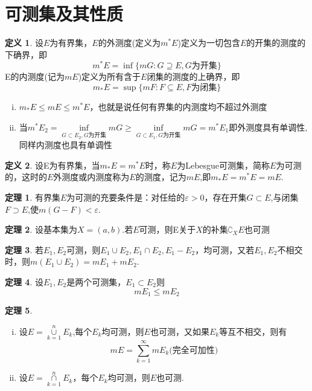 \documentclass[oneside]{ctexbook}
\theoremstyle{definition} \newtheorem{defi}{定义}[section]
\theoremstyle{definition} \newtheorem{law}{定理}[section]
\theoremstyle{definition} \newtheorem{jury}{引理}[section]
\theoremstyle{remark} \newtheorem*{mar}{\heiti 推论}
\begin{document}
\section{可测集及其性质}
\begin{defi}
	设$E$为有界集，$E$的外测度(定义为$m^{*}E$)定义为一切包含$E$的开集的测度的下确界，即\[m^{*}E=\inf\{mG:G\supseteq E,G\text{为开集}\}\]
	E的内测度(记为$mE$)定义为所有含于$E$闭集的测度的上确界，即\[m_{*}E=\sup\{mF:F\subseteq E,F\text{为闭集}\}\]
\end{defi}
\begin{enumerate}[(i)]
	\item $m_{*}E\leq mE\leq m^{*}E$，也就是说任何有界集的内测度均不超过外测度
	\item 当$m^{*}E_{2}=\underset{G\subset E_{2},G\text{为开集}}{\inf}mG\geq \underset{G\subset E_{1},G\text{为开集}}{\inf}mG=m^{*}E_{1}$即外测度具有单调性,同样内测度也具有单调性
\end{enumerate}
\begin{defi}
	设E为有界集，当$m_{*}E=m^{*}E$时，称$E$为Lebesgue可测集，简称$E$为可测的，这时的$E$外测度或内测度称为$E$的测度，记为$mE$,即$m_{*}E=m^{*}E= mE.$
\end{defi}
\begin{law}
	有界集$E$为可测的充要条件是：对任给的$\varepsilon> 0$，存在开集$G\subset E$,与闭集$F\supset E$,使$m(G-F)< \varepsilon $.
\end{law}
\begin{law}
	设基本集为$X=(a,b)$.若$E$可测，则E关于$X$的补集$\complement_{X}E$也可测
\end{law}
\begin{law}
	若$E_{1},E_{2}$可测，则$E_{1}\cup E_{2},E_{1}\cap E_{2},E_{1}-E_{2}$，均可测，又若$E_{1},E_{2}$不相交时，则$m(E_{1}\cup E_{2})=mE_{1}+mE_{2}$.
\end{law}
\begin{law}
	设$E_{1},E_{2}$是两个可测集，$E_{1}\subset E_{2}$则\[mE_{1}\leq mE_{2}\]
\end{law}
\begin{law}
	\begin{enumerate}[(i)]
		\item 设$E=\overset{n}{\underset{k=1}\cup }E_{k}$,每个$E_{k}$均可测，则$E$也可测，又如果$E_{k}$等互不相交，则有\[mE=\sum_{k=1}^{\infty}mE_{k}\text{(完全可加性)}\]
		\item 设$E=\overset{n}{\underset{k=1}\cap }E_{k}$，每个$E_{k}$均可测，则$E$也可测.
	\end{enumerate}
\end{law}
\end{document}
